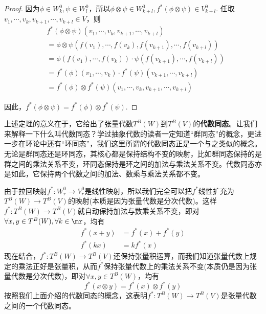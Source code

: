 \begin{proof}
因为$\phi\in W^{0}_{k},\psi\in W^{0}_{l}$，所以$\phi\otimes \psi\in W^{0}_{k+l},f^{\ast}(\phi\otimes \psi)\in V^{0}_{k+l}$. 任取$v_{1},\cdots,v_{k},v_{k+1},\cdots,v_{k+l}\in V$，则
\[
\begin{split}
	&f^{\ast}(\phi\otimes \psi)\left( v_{1},\cdots,v_{k},v_{k+1},\cdots,v_{k+l} \right)\\
	&=\phi\otimes \psi\left( f(v_{1}),\cdots,f(v_{k}),f(v_{k+1}),\cdots,f(v_{k+l}) \right)\\
	&=\phi \left(  f(v_{1}),\cdots,f(v_{k})\right)\cdot \psi \left( f(v_{k+1}),\cdots,f(v_{k+l}) \right)\\
	&=f^{\ast}(\phi) \left( v_{1},\cdots,v_{k} \right)\cdot f^{\ast}(\psi) \left( v_{k+1},\cdots,v_{k+l} \right)\\
	&=f^{\ast}(\phi) \otimes f^{\ast}(\psi) \left( v_{1},\cdots,v_{k},v_{k+1},\cdots,v_{k+l} \right)
\end{split}
\]

因此，$f^{\ast}(\phi\otimes\psi)=f^{\ast}(\phi)\otimes f^{\ast}(\psi)$. 
\end{proof}

上述定理的意义在于，它给出了张量代数$T^{B}(W)$到$T^{B}(V)$的\textbf{代数同态}。让我们来解释一下什么叫代数同态？学过抽象代数的读者一定知道“群同态”的概念，更进一步在环论中还有“环同态”，我们这里所谓的代数同态正是一个与之类似的概念。无论是群同态还是环同态，其核心都是保持结构不变的映射，比如群同态保持的是群之间的乘法关系不变，环同态保持是环之间的加法与乘法关系不变。代数同态亦是如此，它保持两个代数之间的加法、数乘与乘法关系都不变。

由于拉回映射$f^{\ast}:W^{0}_{r}\longrightarrow V^{0}_{r}$是线性映射，所以我们完全可以把$f^{\ast}$线性扩充为$T^{B}(W)\longrightarrow T^{B}(V)$的映射(本质是因为张量代数是分次代数)。这样$f^{\ast}:T^{B}(W)\longrightarrow T^{B}(V)$就自动保持加法与数乘关系不变，即对$\forall x,y\in T^{B}(W),\forall k\in \mr$，均有
\[
\begin{split}
	f^{\ast}(x+y)&=f^{\ast}(x)+f^{\ast}(y)\\
	f^{\ast}(kx)&=kf^{\ast}(x)
\end{split}
\]
现在结合，$f^{\ast}:T^{B}(W)\longrightarrow T^{B}(V)$还保持张量积运算，而我们知道张量代数上规定的乘法正好是张量积，从而$f^{\ast}$保持张量代数上的乘法关系不变(本质仍是因为张量代数是分次代数)，即对$\forall x,y\in T^{B}(W)$，均有
\[
f^{\ast}(x\otimes y)=f^{\ast}(x)\otimes f^{\ast}(y)
\]
按照我们上面介绍的代数同态的概念，这表明$f^{\ast}:T^{B}(W)\longrightarrow T^{B}(V)$是张量代数之间的一个代数同态。


